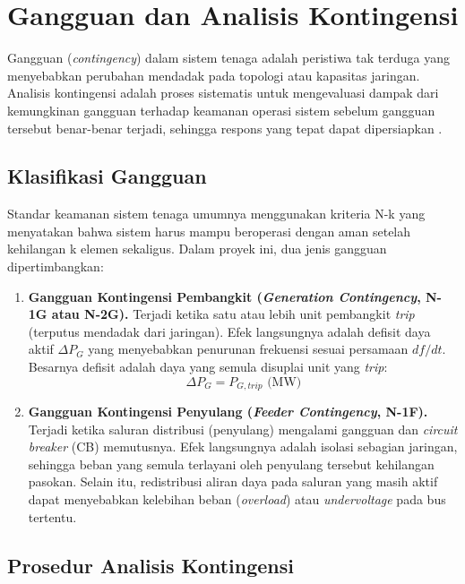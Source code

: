 \section{Gangguan dan Analisis Kontingensi}
\label{sec:Gangguan_dan_Analisis_Kontingensi}

Gangguan (\textit{contingency}) dalam sistem tenaga adalah peristiwa tak terduga yang menyebabkan perubahan mendadak pada topologi atau kapasitas jaringan. Analisis kontingensi adalah proses sistematis untuk mengevaluasi dampak dari kemungkinan gangguan terhadap keamanan operasi sistem sebelum gangguan tersebut benar-benar terjadi, sehingga respons yang tepat dapat dipersiapkan \cite{Wood2014}.

\subsection{Klasifikasi Gangguan}
\label{subsec:Klasifikasi_Gangguan}

Standar keamanan sistem tenaga umumnya menggunakan kriteria N-k yang menyatakan bahwa sistem harus mampu beroperasi dengan aman setelah kehilangan k elemen sekaligus. Dalam proyek ini, dua jenis gangguan dipertimbangkan:

\begin{enumerate}
\item[a.] \textbf{Gangguan Kontingensi Pembangkit (\textit{Generation Contingency}, N-1G atau N-2G).} Terjadi ketika satu atau lebih unit pembangkit \textit{trip} (terputus mendadak dari jaringan). Efek langsungnya adalah defisit daya aktif $\Delta P_{G}$ yang menyebabkan penurunan frekuensi sesuai persamaan $df/dt$. Besarnya defisit adalah daya yang semula disuplai unit yang \textit{trip}:
\begin{equation}
    \Delta P_{G} = P_{G,trip} \text{ (MW)}
\end{equation}

\item[b.] \textbf{Gangguan Kontingensi Penyulang (\textit{Feeder Contingency}, N-1F).} Terjadi ketika saluran distribusi (penyulang) mengalami gangguan dan \textit{circuit breaker} (CB) memutusnya. Efek langsungnya adalah isolasi sebagian jaringan, sehingga beban yang semula terlayani oleh penyulang tersebut kehilangan pasokan. Selain itu, redistribusi aliran daya pada saluran yang masih aktif dapat menyebabkan kelebihan beban (\textit{overload}) atau \textit{undervoltage} pada bus tertentu.
\end{enumerate}

\subsection{Prosedur Analisis Kontingensi}
\label{subsec:Prosedur_Analisis_Kontingensi}

